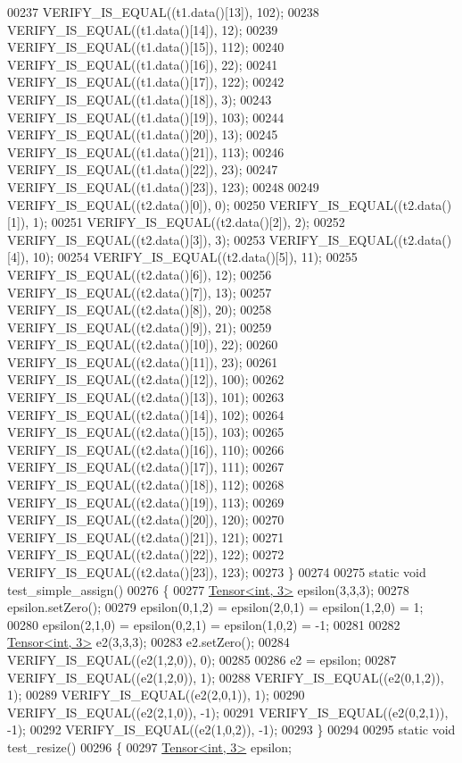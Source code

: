 \begin{DoxyCode}
00237   VERIFY\_IS\_EQUAL((t1.data()[13]), 102);
00238   VERIFY\_IS\_EQUAL((t1.data()[14]),  12);
00239   VERIFY\_IS\_EQUAL((t1.data()[15]), 112);
00240   VERIFY\_IS\_EQUAL((t1.data()[16]),  22);
00241   VERIFY\_IS\_EQUAL((t1.data()[17]), 122);
00242   VERIFY\_IS\_EQUAL((t1.data()[18]),   3);
00243   VERIFY\_IS\_EQUAL((t1.data()[19]), 103);
00244   VERIFY\_IS\_EQUAL((t1.data()[20]),  13);
00245   VERIFY\_IS\_EQUAL((t1.data()[21]), 113);
00246   VERIFY\_IS\_EQUAL((t1.data()[22]),  23);
00247   VERIFY\_IS\_EQUAL((t1.data()[23]), 123);
00248 
00249   VERIFY\_IS\_EQUAL((t2.data()[0]),    0);
00250   VERIFY\_IS\_EQUAL((t2.data()[1]),    1);
00251   VERIFY\_IS\_EQUAL((t2.data()[2]),    2);
00252   VERIFY\_IS\_EQUAL((t2.data()[3]),    3);
00253   VERIFY\_IS\_EQUAL((t2.data()[4]),   10);
00254   VERIFY\_IS\_EQUAL((t2.data()[5]),   11);
00255   VERIFY\_IS\_EQUAL((t2.data()[6]),   12);
00256   VERIFY\_IS\_EQUAL((t2.data()[7]),   13);
00257   VERIFY\_IS\_EQUAL((t2.data()[8]),   20);
00258   VERIFY\_IS\_EQUAL((t2.data()[9]),   21);
00259   VERIFY\_IS\_EQUAL((t2.data()[10]),  22);
00260   VERIFY\_IS\_EQUAL((t2.data()[11]),  23);
00261   VERIFY\_IS\_EQUAL((t2.data()[12]), 100);
00262   VERIFY\_IS\_EQUAL((t2.data()[13]), 101);
00263   VERIFY\_IS\_EQUAL((t2.data()[14]), 102);
00264   VERIFY\_IS\_EQUAL((t2.data()[15]), 103);
00265   VERIFY\_IS\_EQUAL((t2.data()[16]), 110);
00266   VERIFY\_IS\_EQUAL((t2.data()[17]), 111);
00267   VERIFY\_IS\_EQUAL((t2.data()[18]), 112);
00268   VERIFY\_IS\_EQUAL((t2.data()[19]), 113);
00269   VERIFY\_IS\_EQUAL((t2.data()[20]), 120);
00270   VERIFY\_IS\_EQUAL((t2.data()[21]), 121);
00271   VERIFY\_IS\_EQUAL((t2.data()[22]), 122);
00272   VERIFY\_IS\_EQUAL((t2.data()[23]), 123);
00273 \}
00274 
00275 \textcolor{keyword}{static} \textcolor{keywordtype}{void} test\_simple\_assign()
00276 \{
00277   \hyperlink{class_eigen_1_1_tensor}{Tensor<int, 3>} epsilon(3,3,3);
00278   epsilon.setZero();
00279   epsilon(0,1,2) = epsilon(2,0,1) = epsilon(1,2,0) = 1;
00280   epsilon(2,1,0) = epsilon(0,2,1) = epsilon(1,0,2) = -1;
00281 
00282   \hyperlink{class_eigen_1_1_tensor}{Tensor<int, 3>} e2(3,3,3);
00283   e2.setZero();
00284   VERIFY\_IS\_EQUAL((e2(1,2,0)), 0);
00285 
00286   e2 = epsilon;
00287   VERIFY\_IS\_EQUAL((e2(1,2,0)), 1);
00288   VERIFY\_IS\_EQUAL((e2(0,1,2)), 1);
00289   VERIFY\_IS\_EQUAL((e2(2,0,1)), 1);
00290   VERIFY\_IS\_EQUAL((e2(2,1,0)), -1);
00291   VERIFY\_IS\_EQUAL((e2(0,2,1)), -1);
00292   VERIFY\_IS\_EQUAL((e2(1,0,2)), -1);
00293 \}
00294 
00295 \textcolor{keyword}{static} \textcolor{keywordtype}{void} test\_resize()
00296 \{
00297   \hyperlink{class_eigen_1_1_tensor}{Tensor<int, 3>} epsilon;

\end{DoxyCode}
